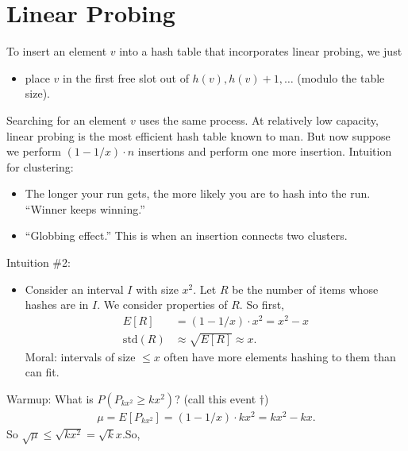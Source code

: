 \documentclass{report}
\begin{document}
\section{Linear Probing}
To insert an element $v$ into a hash table that incorporates linear probing, we just
\begin{itemize}
    \item place $v$ in the first free slot out of $h(v), h(v) + 1, \ldots$ (modulo the table size).
\end{itemize}
Searching for an element $v$ uses the same process. At relatively low capacity, linear probing is the most efficient hash table known to man.
But now suppose we perform $(1 - 1/x)\cdot n$ insertions and perform one more insertion.
\noindent Intuition for clustering:
\begin{itemize}
    \item The longer your run gets, the more likely you are to hash into the run. ``Winner keeps winning.''
    \item ``Globbing effect.'' This is when an insertion connects two clusters. 
\end{itemize}
\noindent Intuition \#2:
\begin{itemize}
    \item Consider an interval $I$ with size $x^2$. Let $R$ be the number of items whose hashes are in $I$. We consider properties of $R$. So first,
    \begin{align*}
        E[R] &= (1-1/x)\cdot x^2 = x^2 - x \\
        \mathrm{std} (R) &\approx \sqrt{E[R]} \approx x.
    \end{align*}
    Moral: intervals of size $\leq x$ often have more elements hashing to them than can fit. 
\end{itemize}
\noindent Warmup: What is $P(P_{kx^2} \geq kx^2)$? (call this event $\dagger$)
\begin{align*}
    \mu = E[P_{kx^2}] = (1-1/x) \cdot kx^2  = kx^2 - kx.
\end{align*}
So $\sqrt \mu \leq \sqrt{kx^2} = \sqrt k x$.So,
\end{document}
